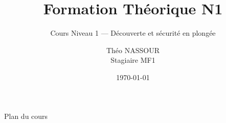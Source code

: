 \documentclass[aspectratio=169]{beamer}
\title[Formation théorique N1]{Formation Théorique N1}
\subtitle{Cours Niveau 1 — Découverte et sécurité en plongée}
\author[Théo NASSOUR]{Théo NASSOUR\\\small Stagiaire MF1}
\institute[CST]{CST — Club Subaquatique Thiernois}
\date[]{\today}
\begin{document}


\begin{frame}{Plan du cours}
  \tableofcontents
\end{frame}














\end{document}
